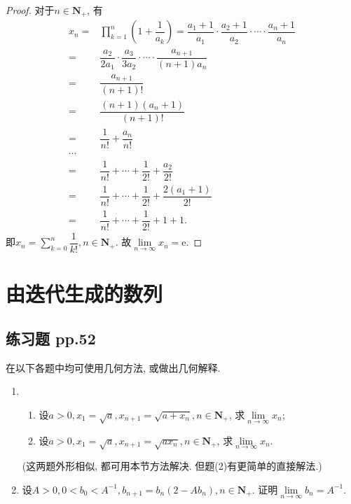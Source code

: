 \documentclass[a4paper,11pt,twoside]{ctexbook}
\newcommand{\e}{\mathrm e}
\begin{document}
\begin{enumerate}
	      \begin{proof}
		      对于$n\in\mathbf{N}_{+}$, 有
		      \[
			      \begin{split}
				      x_n=& \prod_{k=1}^n \left(1+\dfrac{1}{a_k}\right)=\dfrac{a_1+1}{a_1}\cdot\dfrac{a_2+1}{a_2}\cdot\cdots\cdot\dfrac{a_n+1}{a_n}\\
				      =&\dfrac{a_2}{2a_1}\cdot\dfrac{a_3}{3a_2}\cdot\cdots\cdot\dfrac{a_{n+1}}{(n+1)a_n}\\
				      =&\dfrac{a_{n+1}}{(n+1)!}\\
				      =&\dfrac{(n+1)(a_n+1)}{(n+1)!}\\
				      =&\dfrac{1}{n!}+\dfrac{a_n}{n!}\\
				      \cdots&\\
				      =&\dfrac{1}{n!}+\cdots+\dfrac{1}{2!}+\dfrac{a_2}{2!}\\
				      =&\dfrac{1}{n!}+\cdots+\dfrac{1}{2!}+\dfrac{2(a_1+1)}{2!}\\
				      =&\dfrac{1}{n!}+\cdots+\dfrac{1}{2!}+1+1.
			      \end{split}
		      \]
		      即$x_n=\sum\limits_{k=0}^{n}\dfrac{1}{k!}, n\in\mathbf{N}_{+}$. 故$\lim\limits_{n\to\infty} x_n=\e$.\qedhere
	      \end{proof}
\end{enumerate}

\section{由迭代生成的数列}
\subsection{练习题 pp.52}
在以下各题中均可使用几何方法, 或做出几何解释.
\begin{enumerate}
	\item
	      \begin{enumerate}[(1)]
		      \item 设$a>0, x_1=\sqrt{a}, x_{n+1}=\sqrt{a+x_n}, n\in\mathbf{N}_{+}$, 求$\lim\limits_{n\to\infty} x_n$;
		      \item 设$a>0, x_1=\sqrt{a}, x_{n+1}=\sqrt{ax_n}, n\in\mathbf{N}_{+}$, 求$\lim\limits_{n\to\infty} x_n$.
	      \end{enumerate}
	      (这两题外形相似, 都可用本节方法解决. 但题(2)有更简单的直接解法.)

	\item 设$A>0, 0<b_0<A^{-1}, b_{n+1}=b_n(2-Ab_n),n\in\mathbf{N}_{+}$. 证明$\lim\limits_{n\to\infty} b_n=A^{-1}$.
\end{enumerate}
\end{document}
